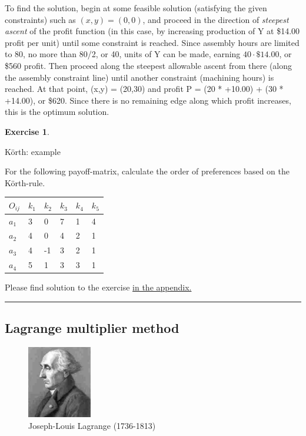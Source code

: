\documentclass[
  12pt,
  oneside]{book}
\theoremstyle{definition}
\theoremstyle{definition}
\theoremstyle{definition}
\newtheorem{exercise}{Exercise}[chapter]
\theoremstyle{definition}
\theoremstyle{remark}
\begin{document}
To find the solution, begin at some feasible solution (satisfying the given constraints) such as \((x,y) = (0,0)\), and proceed in the direction of \emph{steepest ascent} of the profit function (in this case, by increasing production of Y at \$14.00 profit per unit) until some constraint is reached. Since assembly hours are limited to 80, no more than 80/2, or 40, units of Y can be made, earning \(40 \cdot \$14.00\), or \$560 profit. Then proceed along the steepest allowable ascent from there (along the assembly constraint line) until another constraint (machining hours) is reached. At that point, (x,y) = (20,30) and profit P = (20 * +10.00) + (30 * +14.00), or \$620. Since there is no remaining edge along which profit increases, this is the optimum solution.

\begin{exercise}
\protect\hypertarget{exr:koerth-example}{}\label{exr:koerth-example}

Körth: example

For the following payoff-matrix, calculate the order of preferences based on the Körth-rule.

\begin{longtable}[]{@{}llllll@{}}
\toprule()
\(O_{ij}\) & \(k_1\) & \(k_2\) & \(k_3\) & \(k_4\) & \(k_5\) \\
\midrule()
\endhead
\(a_1\) & 3 & 0 & 7 & 1 & 4 \\
\(a_2\) & 4 & 0 & 4 & 2 & 1 \\
\(a_3\) & 4 & -1 & 3 & 2 & 1 \\
\(a_4\) & 5 & 1 & 3 & 3 & 1 \\
\bottomrule()
\end{longtable}

Please find solution to the exercise \protect\hyperlink{sol:koerth-example}{in the appendix.}

\begin{center}\rule{0.5\linewidth}{0.5pt}\end{center}

\end{exercise}

\hypertarget{lagrange-multiplier-method}{%
\subsection{Lagrange multiplier method}\label{lagrange-multiplier-method}}

\begin{figure}
\centering
\includegraphics[width=0.25\textwidth,height=\textheight]{fig/Lagrange.jpg}
\caption{\label{fig:Lagrange} Joseph-Louis
Lagrange (1736-1813)}
\end{figure}
\end{document}
